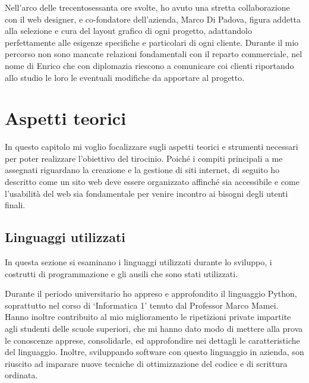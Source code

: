 \documentclass[12pt,a4paper]{article}
\begin{document}
Nell’arco delle trecentosessanta ore svolte, ho avuto una stretta collaborazione con il web designer, e co-fondatore dell’azienda, Marco Di Padova, figura addetta alla selezione e cura del layout grafico di ogni progetto, adattandolo perfettamente alle esigenze specifiche e particolari di ogni cliente.
Durante il mio percorso non sono mancate relazioni fondamentali con il reparto commerciale, nel nome di Enrico che con diplomazia riescono a comunicare coi clienti riportando allo studio le loro le eventuali modifiche da apportare al progetto.

\clearpage
\section{Aspetti teorici}
In questo capitolo mi voglio focalizzare sugli aspetti teorici e strumenti necessari per poter realizzare l’obiettivo del tirocinio. Poiché i compiti principali a me assegnati riguardano la creazione e la gestione di siti internet, di seguito ho descritto come un sito web deve essere organizzato affinché sia accessibile e come l’usabilità del web sia fondamentale per venire incontro ai bisogni degli utenti finali.

\subsection{Linguaggi utilizzati}
In questa sezione si esaminano i linguaggi utilizzati durante lo sviluppo, i costrutti di programmazione e gli ausili che sono stati utilizzati.

Durante il periodo universitario ho appreso e approfondito il linguaggio Python, soprattutto nel corso di ‘Informatica 1’ tenuto dal Professor Marco Mamei. Hanno inoltre contribuito al mio miglioramento le ripetizioni private impartite agli studenti delle scuole superiori, che mi hanno dato modo di mettere alla prova le conoscenze apprese, consolidarle, ed approfondire nei dettagli le caratteristiche del linguaggio.
Inoltre, sviluppando software con questo linguaggio in azienda, son riuscito ad imparare nuove tecniche di ottimizzazione del codice e di scrittura ordinata.
\end{document}
